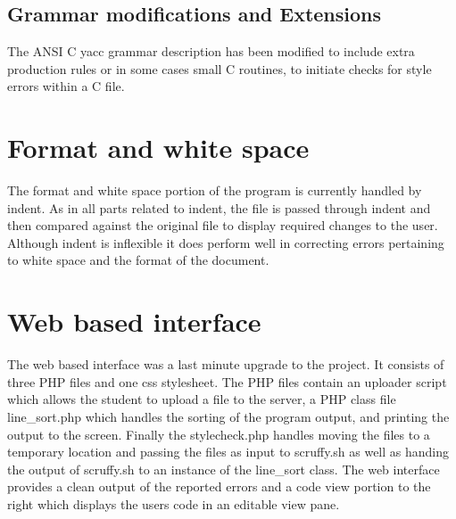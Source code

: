 \subsection{Grammar modifications and Extensions}
The ANSI C yacc grammar description has been modified to include extra 
production rules or in some cases small C routines, to initiate checks for 
style errors within a C file. 

\section{Format and white space}
The format and white space portion of the program is currently handled by 
indent. As in all parts related to indent, the file is passed through indent 
and then compared against the original file to display required changes to the 
user. Although indent is inflexible it does perform well in correcting errors
pertaining to white space and the format of the document.

\section{Web based interface}
The web based interface was a last minute upgrade to the project. It consists 
of three PHP files and one css stylesheet. The PHP files contain an uploader
script which allows the student to upload a file to the server, a PHP class 
file line\_sort.php which handles the sorting of the program output, and 
printing the output to the screen. Finally the stylecheck.php handles moving 
the files to a temporary location and passing the files as input to scruffy.sh
as well as handing the output of scruffy.sh to an instance of the line\_sort 
class. 
The web interface provides a clean output of the reported errors and a code 
view portion to the right which displays the users code in an editable view 
pane.
